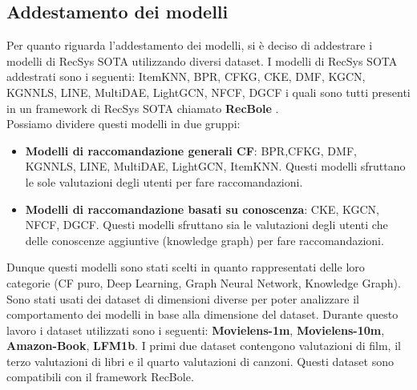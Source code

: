 \subsection{Addestamento dei modelli}

Per quanto riguarda l'addestamento dei modelli, si è deciso di addestrare i modelli di RecSys SOTA utilizzando diversi dataset. I modelli di RecSys SOTA addestrati sono i seguenti: ItemKNN, BPR, CFKG, CKE, DMF, KGCN, KGNNLS, LINE, MultiDAE, LightGCN, NFCF, DGCF i quali sono tutti presenti in un framework di RecSys SOTA chiamato \textbf{RecBole} \cite{recbole}.\\
Possiamo dividere questi modelli in due gruppi:
\begin{itemize}
    \item \textbf{Modelli di raccomandazione generali CF}: BPR,CFKG, DMF, KGNNLS, LINE, MultiDAE, LightGCN, ItemKNN. Questi modelli sfruttano le sole valutazioni degli utenti per fare raccomandazioni.
    \item \textbf{Modelli di raccomandazione basati su conoscenza}: CKE, KGCN, NFCF, DGCF. Questi modelli sfruttano sia le valutazioni degli utenti che delle conoscenze aggiuntive (knowledge graph) per fare raccomandazioni.
\end{itemize}
\noindent Dunque questi modelli sono stati scelti in quanto rappresentati delle loro categorie (CF puro, Deep Learning, Graph Neural Network, Knowledge Graph).\\ 
Sono stati usati dei dataset di dimensioni diverse per poter analizzare il comportamento dei modelli in base alla dimensione del dataset. Durante questo lavoro i dataset utilizzati sono i seguenti: \textbf{Movielens-1m}, \textbf{Movielens-10m}, \textbf{Amazon-Book}, \textbf{LFM1b}. I primi due dataset contengono valutazioni di film, il terzo valutazioni di libri e il quarto valutazioni di canzoni. Questi dataset sono compatibili con il framework RecBole.


